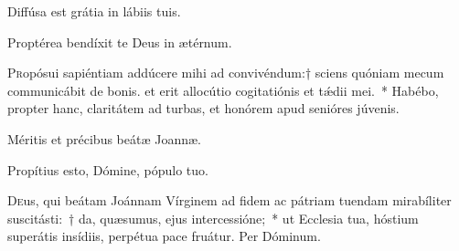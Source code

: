 \documentclass[vesperale_romanum.tex]{subfiles}
\begin{document}
\admagnificat


\vv Diffúsa est grátia in lábiis tuis.

\rr Proptérea bendíxit te Deus in ætérnum.

\quadcommferiae

\myrule











\lettrine{P}{r}opósui sapiéntiam addúcere mihi ad convivéndum:† sciens quóniam mecum communicábit de bonis. et erit allocútio cogitatiónis et tǽdii mei.~* Habébo, pro\-pter hanc, claritátem ad turbas, et honórem apud senióres júvenis.

\hymnus 


\vv Méritis et précibus beátæ Joannæ. \tpalleluia

\rr Propítius esto, Dómine, pópulo tuo. \tpalleluia

\admagnificat


\oratio

\lettrine{D}{e}us, qui beátam Joánnam Vírginem ad fidem ac pátriam tuendam mirabíliter suscitásti:~† da, quæsumus, ejus intercessióne;~* ut Ecclesia tua, hóstium superátis insídiis, perpétua pace fruátur. Per Dóminum.



\ivesperisrubric
\end{document}
